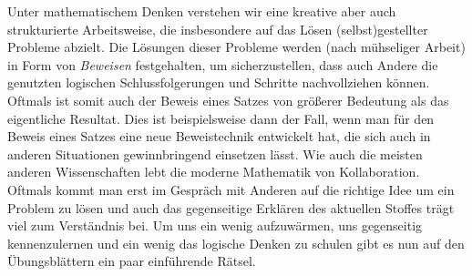 Unter mathematischem Denken verstehen wir eine kreative aber auch strukturierte Arbeitsweise, die insbesondere
auf das Lösen (selbst)gestellter Probleme abzielt. Die Lösungen dieser Probleme werden (nach mühseliger Arbeit) in Form 
von \textit{Beweisen} festgehalten, um sicherzustellen, dass auch Andere die genutzten logischen Schlussfolgerungen und Schritte nachvollziehen können.
Oftmals ist somit auch der Beweis eines Satzes von größerer Bedeutung als das eigentliche Resultat. Dies ist beispielsweise dann der Fall, wenn man
für den Beweis eines Satzes eine neue Beweistechnik entwickelt hat, die sich auch in anderen Situationen gewinnbringend einsetzen lässt. \hfill
Wie auch die meisten anderen Wissenschaften lebt die moderne Mathematik von Kollaboration. Oftmals kommt man erst im Gespräch mit Anderen 
auf die richtige Idee um ein Problem zu lösen und auch das gegenseitige Erklären des aktuellen Stoffes trägt viel zum Verständnis bei.
\newline 
Um uns ein wenig aufzuwärmen, uns gegenseitig kennenzulernen  und ein wenig das logische Denken zu schulen gibt es nun auf den Übungsblättern ein paar einführende Rätsel. 
